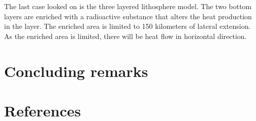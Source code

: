 \documentclass[10pt,a4paper]{article}
\begin{document}
\noindent The last case looked on is the three layered lithosphere model. The two bottom layers are enriched with a radioactive substance that alters the heat production in the layer. The enriched area is limited to 150 kilometers of lateral extension. As the enriched area is limited, there will be heat flow in horizontal direction.  








\newpage
\section*{Concluding remarks}





\newpage
\section*{References}
\end{document}
